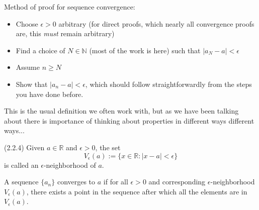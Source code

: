 \documentclass{ximera}
\begin{document}
Method of proof for sequence convergence:
\begin{itemize}
    \item Choose $\epsilon > 0$ arbitrary (for direct proofs, which nearly all convergence proofs are, this \textit{must} remain arbitrary)
    \item Find a choice of $N \in \mathbb{N}$ (most of the work is here) such that $|a_N - a| < \epsilon$
    \item Assume $n\geq N$
    \item Show that $|a_n -a| < \epsilon$, which should follow straightforwardly from the steps you have done before.
\end{itemize}

This is the usual definition we often work with, but as we have been talking about there is importance of thinking about properties in different ways different ways...

\begin{definition}{(2.2.4)}
    Given $a \in \mathbb{R}$ and $\epsilon > 0$, the set \[V_\epsilon(a) := \{ x \in \mathbb{R}: |x-a| < \epsilon \} \]
    is called an $\epsilon$-neighborhood of $a$.
\end{definition}


\begin{definition}
    A sequence $\{a_n\}$ converges to $a$ if for all $\epsilon > 0$ and corresponding $\epsilon$-neighborhood $V_\epsilon(a)$, there exists a point in the sequence after which all the elements are in $V_\epsilon(a)$.
\end{definition}
\end{document}
